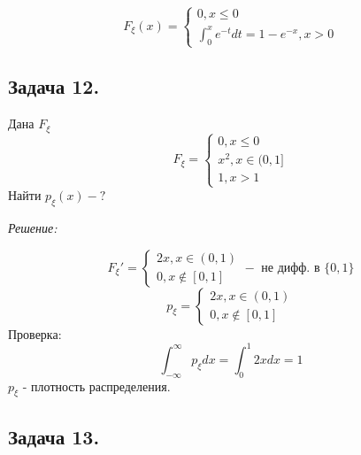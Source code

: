 \[ F_{\xi} (x) =
\begin{cases}
	0, x \le 0 \\
	\int_{0}^{x} e^{-t} dt = 1 - e^{-x}, x>0
\end{cases}
\]
\begin{figure}[H]
\end{figure}

\subsection*{Задача 12.}

Дана $F_{\xi}$
\[ F_{\xi} =
\begin{cases}
	0, x \le 0 \\
	x^2, x \in (0,1] \\
	1, x > 1
\end{cases}
\]
Найти $p_{\xi}(x) - ?$

\noindent \textit{Решение:}

\[
F_{\xi}' =
\begin{cases}
	2x, x \in (0,1) \\
	0, x \notin [0,1]
\end{cases} -
\text{ не дифф. в } \{0,1\}
\]
\[
p_{\xi} =
\begin{cases}
	2x, x \in (0,1) \\
	0, x \notin [0,1]
\end{cases}
\]
Проверка:
\[
\int_{-\infty}^{\infty} p_{\xi} dx = \int_{0}^{1} 2x dx = 1
\]
$p_{\xi}$ - плотность распределения.

\subsection*{Задача 13.}


